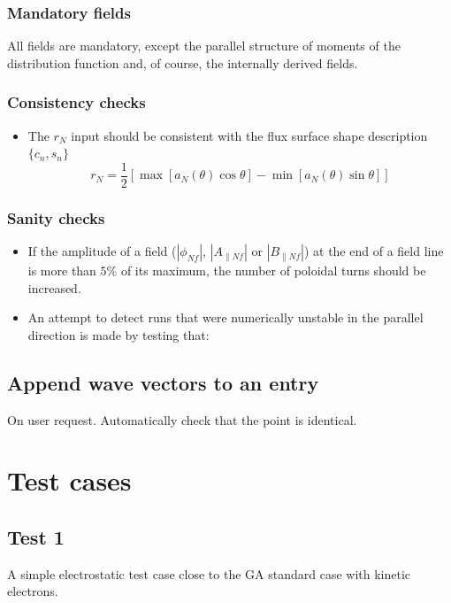 \documentclass[a4paper]{report}
\begin{document}
\subsection{Mandatory fields}
All fields are mandatory, except the parallel structure of moments of the distribution function and, of course, the internally derived fields. 


\subsection{Consistency checks}
\begin{itemize}
\item The $r_N$ input should be consistent with the flux surface shape description $\{c_n,s_n\}$
$$r_N = \frac{1}{2}\left[\max[a_N(\theta)\cos\theta]-\min[a_N(\theta)\sin\theta]\right]$$

\end{itemize}

\subsection{Sanity checks}
\begin{itemize}
\item If the amplitude of a field ($|\phi_{Nf}|$, $|A_{\parallel Nf}|$ or $|B_{\parallel Nf}|$) at the end of a field line is more than $5\%$ of its maximum, the number of poloidal turns should be increased.
\item An attempt to detect runs that were numerically unstable in the parallel direction is made by testing that: 
\end{itemize}

\section{Append wave vectors to an entry}
On user request. Automatically check that the point is identical.

\chapter{Test cases}

\section{Test 1}
A simple electrostatic test case close to the GA standard case with kinetic electrons.



\end{document}
